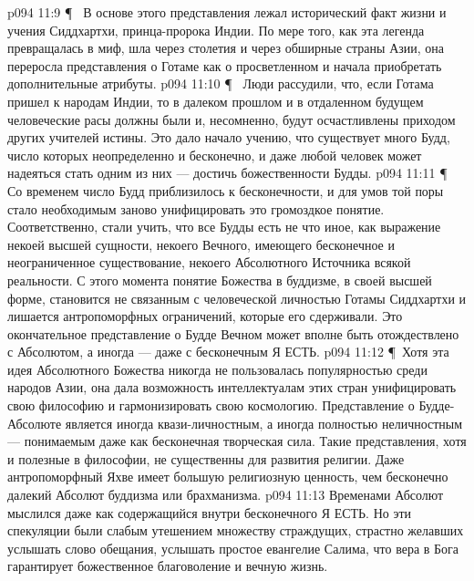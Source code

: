 \vs p094 11:9 \P\ \bibnobreakspace {} В основе этого представления лежал исторический факт жизни и учения Сиддхартхи, принца\hyp{}пророка Индии. По мере того, как эта легенда превращалась в миф, шла через столетия и через обширные страны Азии, она переросла представления о Готаме как о просветленном и начала приобретать дополнительные атрибуты.
\vs p094 11:10 \P\ \bibnobreakspace {} Люди рассудили, что, если Готама пришел к народам Индии, то в далеком прошлом и в отдаленном будущем человеческие расы должны были и, несомненно, будут осчастливлены приходом других учителей истины. Это дало начало учению, что существует много Будд, число которых неопределенно и бесконечно, и даже любой человек может надеяться стать одним из них --- достичь божественности Будды.
\vs p094 11:11 \P\ \bibnobreakspace {}  Со временем число Будд приблизилось к бесконечности, и для умов той поры стало необходимым заново унифицировать это громоздкое понятие. Соответственно, стали учить, что все Будды есть не что иное, как выражение некоей высшей сущности, некоего Вечного, имеющего бесконечное и неограниченное существование, некоего Абсолютного Источника всякой реальности. С этого момента понятие Божества в буддизме, в своей высшей форме, становится не связанным с человеческой личностью Готамы Сиддхартхи и лишается антропоморфных ограничений, которые его сдерживали. Это окончательное представление о Будде Вечном может вполне быть отождествлено с Абсолютом, а иногда --- даже с бесконечным Я ЕСТЬ.
\vs p094 11:12 \P\ Хотя эта идея Абсолютного Божества никогда не пользовалась популярностью среди народов Азии, она дала возможность интеллектуалам этих стран унифицировать свою философию и гармонизировать свою космологию. Представление о Будде\hyp{}Абсолюте является иногда квази\hyp{}личностным, а иногда полностью неличностным --- понимаемым даже как бесконечная творческая сила. Такие представления, хотя и полезные в философии, не существенны для развития религии. Даже антропоморфный Яхве имеет большую религиозную ценность, чем бесконечно далекий Абсолют буддизма или брахманизма.
\vs p094 11:13 Временами Абсолют мыслился даже как содержащийся внутри бесконечного Я ЕСТЬ. Но эти спекуляции были слабым утешением множеству страждущих, страстно желавших услышать слово обещания, услышать простое евангелие Салима, что вера в Бога гарантирует божественное благоволение и вечную жизнь.
